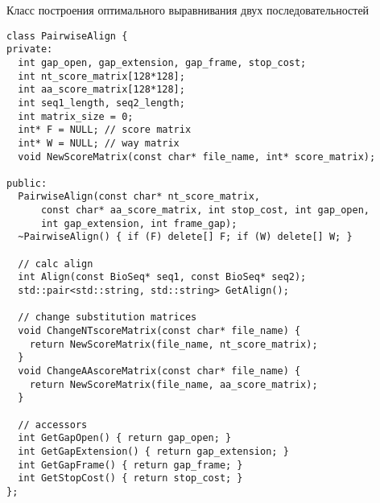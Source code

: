 \begin{algorithm}
	\caption{Класс построения оптимального выравнивания двух последовательностей} \label{lst:PairwiseAligner}
	\begin{lstlisting}
class PairwiseAlign {
private:
  int gap_open, gap_extension, gap_frame, stop_cost;
  int nt_score_matrix[128*128];
  int aa_score_matrix[128*128];
  int seq1_length, seq2_length; 
  int matrix_size = 0;
  int* F = NULL; // score matrix
  int* W = NULL; // way matrix
  void NewScoreMatrix(const char* file_name, int* score_matrix);
  
public:
  PairwiseAlign(const char* nt_score_matrix, 
      const char* aa_score_matrix, int stop_cost, int gap_open, 
      int gap_extension, int frame_gap);
  ~PairwiseAlign() { if (F) delete[] F; if (W) delete[] W; }
  
  // calc align 
  int Align(const BioSeq* seq1, const BioSeq* seq2);
  std::pair<std::string, std::string> GetAlign();
  
  // change substitution matrices
  void ChangeNTscoreMatrix(const char* file_name) {
    return NewScoreMatrix(file_name, nt_score_matrix);
  }
  void ChangeAAscoreMatrix(const char* file_name) {
    return NewScoreMatrix(file_name, aa_score_matrix);
  }
  
  // accessors
  int GetGapOpen() { return gap_open; } 
  int GetGapExtension() { return gap_extension; } 
  int GetGapFrame() { return gap_frame; } 
  int GetStopCost() { return stop_cost; } 
};
	\end{lstlisting}
\end{algorithm}

